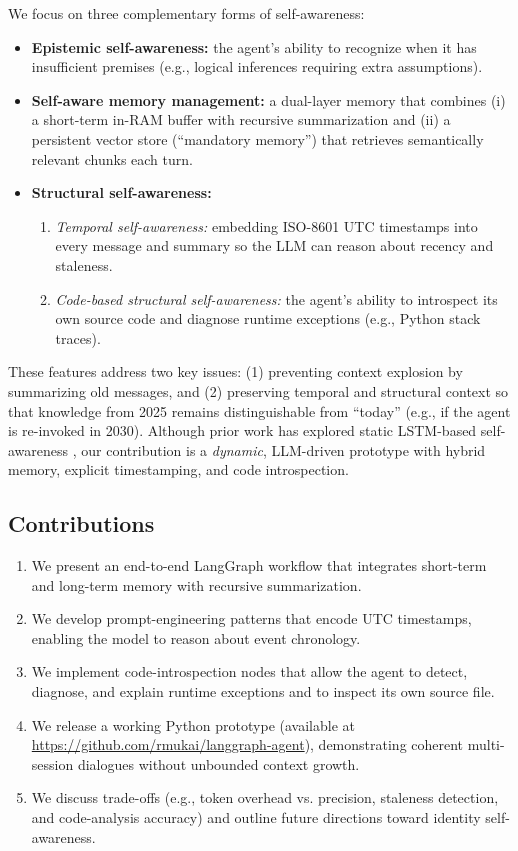 \documentclass[11pt]{article}
\begin{document}
We focus on three complementary forms of self-awareness:
\begin{itemize}[leftmargin=*]
  \item \textbf{Epistemic self-awareness:} the agent’s ability to recognize when it has insufficient premises (e.g., logical inferences requiring extra assumptions).
  \item \textbf{Self-aware memory management:} a dual-layer memory that combines (i) a short-term in-RAM buffer with recursive summarization and (ii) a persistent vector store (“mandatory memory”) that retrieves semantically relevant chunks each turn.
  \item \textbf{Structural self-awareness:}  
    \begin{enumerate}[leftmargin=*, label=(\alph*)]
      \item \emph{Temporal self-awareness:} embedding ISO-8601 UTC timestamps into every message and summary so the LLM can reason about recency and staleness.  
      \item \emph{Code-based structural self-awareness:} the agent’s ability to introspect its own source code and diagnose runtime exceptions (e.g., Python stack traces).
    \end{enumerate}
\end{itemize}

These features address two key issues: (1) preventing context explosion by summarizing old messages, and (2) preserving temporal and structural context so that knowledge from 2025 remains distinguishable from “today” (e.g., if the agent is re-invoked in 2030). Although prior work has explored static LSTM-based self-awareness \cite{Mukai2020}, our contribution is a \emph{dynamic}, LLM-driven prototype with hybrid memory, explicit timestamping, and code introspection.

\subsection{Contributions}
\begin{enumerate}[leftmargin=*]
  \item We present an end-to-end LangGraph workflow that integrates short-term and long-term memory with recursive summarization.
  \item We develop prompt-engineering patterns that encode UTC timestamps, enabling the model to reason about event chronology.
  \item We implement code-introspection nodes that allow the agent to detect, diagnose, and explain runtime exceptions and to inspect its own source file.
  \item We release a working Python prototype (available at \url{https://github.com/rmukai/langgraph-agent}), demonstrating coherent multi-session dialogues without unbounded context growth.
  \item We discuss trade-offs (e.g., token overhead vs. precision, staleness detection, and code-analysis accuracy) and outline future directions toward identity self-awareness.
\end{enumerate}
\end{document}

